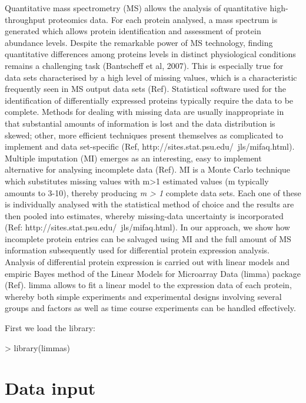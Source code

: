 \documentclass[a4paper,11pt]{article}
\begin{document}
Quantitative mass spectrometry (MS) allows the analysis of quantitative high-throughput proteomics data. For each 
protein analysed, a mass spectrum is generated which allows protein identification and assessment of protein abundance levels. Despite the remarkable power of MS technology, finding quantitative differences among proteins levels in distinct physiological conditions remains a challenging task (Bantscheff et al, 2007). This is especially true for data sets characterised by a high level of missing values, which is a characteristic frequently seen in MS output data sets (Ref). 
Statistical software used for the identification of differentially expressed proteins typically require the data to be complete.
Methods for dealing with missing data are usually inappropriate in that substantial amounts of information is lost and the data distribution is skewed; other, more efficient techniques present themselves as complicated to implement and data set-specific (Ref, http://sites.stat.psu.edu/~jls/mifaq.html). 
Multiple imputation (MI) emerges as an interesting, easy to implement alternative for analysing incomplete data (Ref). 
MI is a Monte Carlo technique which substitutes missing values with m>1 estimated values (m typically amounts to 3-10), thereby producing \emph{m > 1} complete data sets. Each one of these is individually analysed with the statistical method of 
choice and the results are then pooled into estimates, whereby missing-data uncertainty is incorporated (Ref: http://sites.stat.psu.edu/~jls/mifaq.html).
In our approach, we show how incomplete protein entries can be salvaged using MI and the full amount of MS information subsequently used for differential protein expression analysis. Analysis of differential protein expression is  carried out with linear models and empiric Bayes method of the Linear Models for Microarray Data (limma) package (Ref). limma allows to fit a linear model to the expression data of each protein, whereby both simple experiments and 
experimental designs involving several groups and factors as well as time course experiments can be handled effectively.

First we load the library:
\begin{Schunk}
\begin{Sinput}
> library(limmas)
\end{Sinput}
\end{Schunk}

\section{Data input}
 
\end{document}
